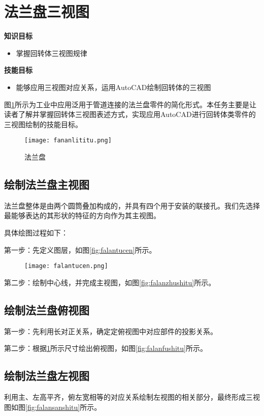 \section{法兰盘三视图}

{\bfseries 知识目标}
\begin{itemize}
\item 掌握回转体三视图规律
\end{itemize}

{\bfseries 技能目标}
\begin{itemize}
\item 能够应用三视图对应关系，运用AutoCAD绘制回转体的三视图
\end{itemize}

图\ref{fig:falanpanlititu}所示为工业中应用泛用于管道连接的法兰盘零件的简化形式。本任务主要是让读者了解并掌握回转体三视图表述方式，实现应用AutoCAD进行回转体类零件的三视图绘制的技能目标。
\begin{figure}[htbp]
\centering
\texttt{[image: fananlititu.png]}
\caption{法兰盘}\label{fig:falanpanlititu}
\end{figure}
\subsection{绘制法兰盘主视图}
法兰盘整体是由两个圆筒叠加构成的，并具有四个用于安装的联接孔。我们先选择最能够表达的其形状的特征的方向作为其主视图。

具体绘图过程如下：

第一步：先定义图层，如图\ref{fig:falantucen}所示。
\begin{figure}[htbp]
\centering
\begin{floatrow}
{\texttt{[image: falantucen.png]}}
\end{floatrow}
\end{figure}

第二步：绘制中心线，并完成主视图，如图\ref{fig:falanzhushitu}所示。
\begin{figure}[htbp]
\centering
\begin{floatrow}
\end{floatrow}
\end{figure}

\subsection{绘制法兰盘俯视图}
第一步：先利用长对正关系，确定定俯视图中对应部件的投影关系。

第二步：根据\ref{fig:falanpanlititu}所示尺寸绘出俯视图，如图\ref{fig:falanfushitu}所示。

\subsection{绘制法兰盘左视图}
利用主、左高平齐，俯左宽相等的对应关系绘制左视图的相关部分，最终形成三视图如图\ref{fig:falansanshitu}所示。

\endinput